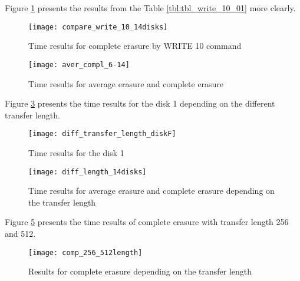 \newpage
Figure \ref{fig:compare_write_10_14disks} presents the results from the Table \ref{tbl:tbl_write_10_01} more clearly.

\begin{figure}[h!]
\begin{center}
  \texttt{[image: compare\_write\_10\_14disks]}
\end{center}
  \caption{Time results for complete erasure by WRITE 10 command}
  \label{fig:compare_write_10_14disks}
\end{figure}


\begin{figure}[h!]
\begin{center}
  \texttt{[image: aver\_compl\_6-14]}
\end{center}
  \caption{Time results for average erasure and complete erasure}
  \label{fig:aver_compl_6-14}
\end{figure}

\newpage
Figure \ref{fig:diff_transfer_length_diskF} presents the time results for the disk 1 depending on the different transfer length.

\begin{figure}[h!]
\begin{center}
  \texttt{[image: diff\_transfer\_length\_diskF]}
\end{center}
  \caption{Time results for the disk 1}
  \label{fig:diff_transfer_length_diskF}
\end{figure}


\begin{figure}[h!]
\begin{center}
  \texttt{[image: diff\_length\_14disks]}
\end{center}
  \caption{Time results for average erasure and complete erasure depending on the transfer length}
  \label{fig:diff_length_14disks}
\end{figure}


\newpage
Figure \ref{fig:comp_256_512length} presents the time results of complete erasure with transfer length 256 and 512.
\begin{figure}[h!]
\begin{center}
  \texttt{[image: comp\_256\_512length]}
\end{center}
  \caption{Results for complete erasure depending on the transfer length}
  \label{fig:comp_256_512length}
\end{figure}

